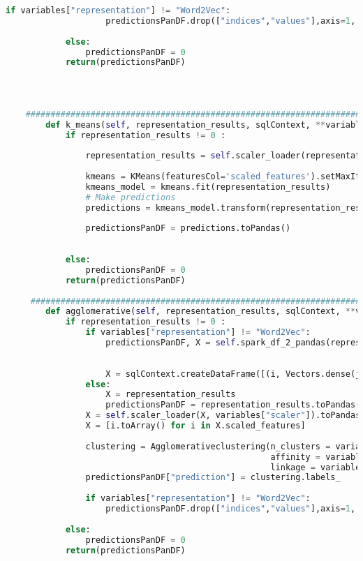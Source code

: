 \documentclass[12pt]{article}
\begin{document}
\begin{lstlisting}[language=Python, caption = Clase Clusters]
	            if variables["representation"] != "Word2Vec":
	                predictionsPanDF.drop(["indices","values"],axis=1, inplace=True)
	            
	        else:
	            predictionsPanDF = 0
	        return(predictionsPanDF)
	        
	    
	    
	    
	###############################################################################
	    def k_means(self, representation_results, sqlContext, **variables):
	        if representation_results != 0 :
	            
	            representation_results = self.scaler_loader(representation_results, variables["scaler"])
	            
	            kmeans = KMeans(featuresCol='scaled_features').setMaxIter(variables["numIterations"]).setK(variables["numb_clusters"])
	            kmeans_model = kmeans.fit(representation_results)
	            # Make predictions
	            predictions = kmeans_model.transform(representation_results)
	            
	            predictionsPanDF = predictions.toPandas()
	            
	            
	        else:
	            predictionsPanDF = 0
	        return(predictionsPanDF)
	
	 #############################################################################   
	    def agglomerative(self, representation_results, sqlContext, **variables):
	        if representation_results != 0 :
	            if variables["representation"] != "Word2Vec":
	                predictionsPanDF, X = self.spark_df_2_pandas(representation_results)
	                
	                
	                X = sqlContext.createDataFrame([(i, Vectors.dense(j),) for i,j in enumerate(X)], ["id", "features"])
	            else:
	                X = representation_results
	                predictionsPanDF = representation_results.toPandas()
	            X = self.scaler_loader(X, variables["scaler"]).toPandas()
	            X = [i.toArray() for i in X.scaled_features]
	            
	            clustering = Agglomerativeclustering(n_clusters = variables["numb_clusters"],
	                                                 affinity = variables["aff"],
	                                                 linkage = variables["link"]).fit(X)
	            predictionsPanDF["prediction"] = clustering.labels_
	            
	            if variables["representation"] != "Word2Vec":
	                predictionsPanDF.drop(["indices","values"],axis=1, inplace=True)
	            
	        else:
	            predictionsPanDF = 0
	        return(predictionsPanDF)
	\end{lstlisting}
	
\end{document}
